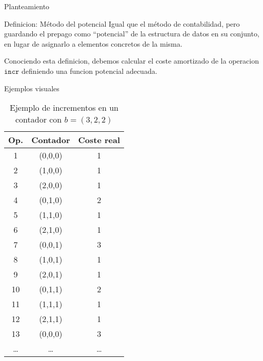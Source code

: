 \documentclass[aspectratio=169]{beamer}
\begin{document}
\begin{frame}{Planteamiento}
    \begin{exampleblock}{Definicion: Método del potencial}
        Igual que el método de contabilidad, pero guardando el prepago como “potencial” de la estructura de datos en su conjunto, en lugar de asignarlo a elementos concretos de la misma.

    \end{exampleblock}
    Conociendo esta definicion, debemos calcular el coste amortizado de la operacion $\texttt{incr}$ definiendo una funcion potencial adecuada.\\
\end{frame}

\begin{frame}{Ejemplos visuales}
    \begin{table}
        \centering
        {\footnotesize
            \begin{tabular}{|c|c|c|}
                \hline
                \textbf{Op.} & \textbf{Contador} & \textbf{Coste real} \\
                \hline
                1            & (0,0,0)           & 1                   \\
                2            & (1,0,0)           & 1                   \\
                3            & (2,0,0)           & 1                   \\
                4            & (0,1,0)           & 2                   \\
                5            & (1,1,0)           & 1                   \\
                6            & (2,1,0)           & 1                   \\
                7            & (0,0,1)           & 3                   \\
                8            & (1,0,1)           & 1                   \\
                9            & (2,0,1)           & 1                   \\
                10           & (0,1,1)           & 2                   \\
                11           & (1,1,1)           & 1                   \\
                12           & (2,1,1)           & 1                   \\
                13           & (0,0,0)           & 3                   \\
                \ldots       & \ldots            & \ldots              \\
                \hline
            \end{tabular}
        }
        \caption{Ejemplo de incrementos en un contador con $b = (3,2,2)$}
    \end{table}
\end{frame}
\end{document}
